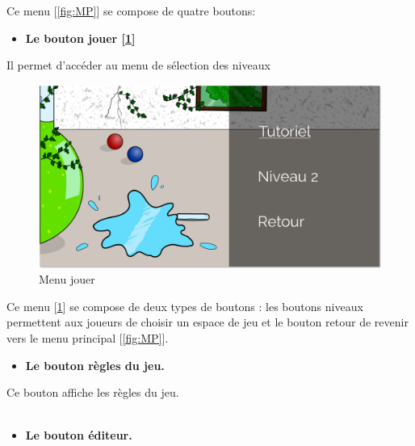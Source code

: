 \noindent Ce menu [\ref{fig:MP}] se compose de quatre boutons:\\
\begin {itemize}
\item \bf Le bouton jouer [\ref{fig:MJ}]\\
\end {itemize}

Il permet d'accéder au menu de sélection des niveaux



\newpage

\begin{figure} [!h]
    \centerline {\includegraphics[width=13cm]{figures/menu_jouer.png}}
    \caption {Menu jouer}
    \label {fig:MJ}
\end{figure}

\noindent Ce menu [\ref{fig:MJ}] se compose de deux types de boutons : les boutons niveaux permettent aux joueurs de choisir un espace de jeu et
le bouton retour de revenir vers le menu principal [\ref{fig:MP}].\\

\begin {itemize}
\item \bf Le bouton règles du jeu.
\end {itemize}

Ce bouton affiche les règles du jeu.
\\
\\

\begin {itemize}
\item \bf Le bouton éditeur.
\end {itemize}

